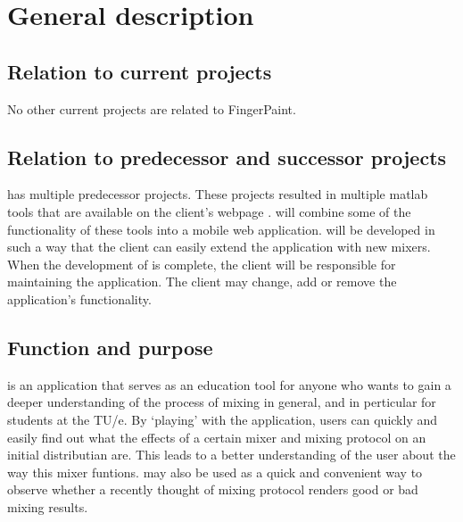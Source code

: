 \chapter{General description}
\label{chap:gendesc}

\section{Relation to current projects}
\label{sec:curproj}
No other current projects are related to FingerPaint.

\section{Relation to predecessor and successor projects}
\label{sec:predsuc}
\projectname has multiple predecessor projects. These projects resulted in multiple matlab tools that are available on the client's webpage \cite{clientpage}. \projectname will combine some of the functionality of these tools into a mobile web application. \projectname will be developed in such a way that the client can easily extend the application with new mixers. When the development of \projectname is complete, the client will be responsible for maintaining the application. The client may change, add or remove the application's functionality.

\section{Function and purpose}
\label{sec:functpurp}
\projectname is an application that serves as an education tool for anyone who wants to gain a deeper understanding of the process of mixing in general, and in perticular for students at the TU/e. By `playing' with the application, users can quickly and easily find out what the effects of a certain mixer and mixing protocol on an initial distributian are. This leads to a better understanding of the user about the way this mixer funtions. \projectname may also be used as a quick and convenient way to observe whether a recently thought of mixing protocol renders good or bad mixing results.

